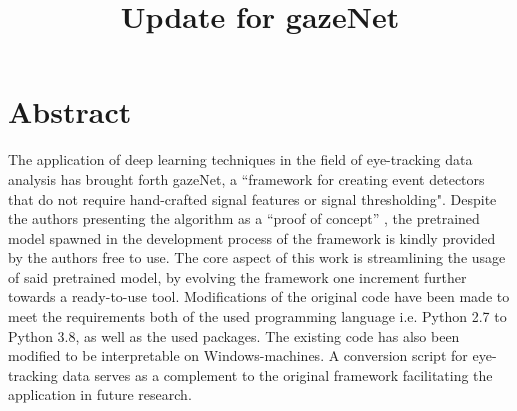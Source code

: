 \documentclass[conference]{IEEEtran}
\begin{document}
\title{Update for gazeNet\\
}

\author{
\and
{}
\and
{}
}

\maketitle
\section{Abstract}
The application of deep learning techniques in the field of eye-tracking data analysis has brought forth gazeNet, a ``framework for creating event detectors that do not require hand-crafted signal features or signal thresholding". \citet{zemblys2018gazeNet} Despite the authors presenting the algorithm as a ``proof of concept'' \citet{zemblys2018gazeNet}, the pretrained model spawned in the development process of the  framework is kindly provided by the authors free to use. The core aspect of this work is streamlining the usage of said pretrained model, by evolving the framework one increment further towards a ready-to-use tool. Modifications of the original code have been made to meet the requirements both of the used programming language i.e. Python 2.7 to Python 3.8, as well as the used packages. The existing code has also been modified to be interpretable on Windows-machines. A conversion script for eye-tracking data serves as a complement to the original framework facilitating the application in future research.
\end{document}
